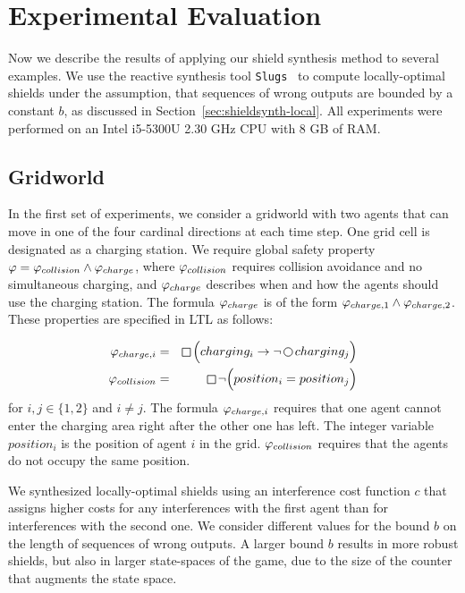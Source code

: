 \section{Experimental Evaluation}
\label{sec_exp}

Now we describe the results of applying our shield synthesis method to several examples. We use the reactive synthesis tool \texttt{Slugs}~\cite{EhlersR16} to compute locally-optimal shields
under the assumption, that sequences of wrong outputs are bounded by a constant $b$, as discussed in Section~\ref{sec:shieldsynth-local}.
All experiments were  performed on an Intel i5-5300U 2.30 GHz CPU with 8 GB of RAM.

\subsection{Gridworld}\label{exp:gridworld}
In the first set of experiments, we consider a gridworld with two agents that can move in one of the four cardinal directions at each time step. One grid cell is designated as a charging station. We require global safety property $\varphi = \varphi_{collision} \wedge \varphi_{charge}$, where $\varphi_{collision}$ requires collision avoidance and no simultaneous charging, and $\varphi_{charge}$ describes when and how the agents should use the charging station.
  The formula $\varphi_{charge}$ is of the form $\varphi_{charge,1} \wedge \varphi_{charge,2}$. These properties are specified in LTL as follows:
  \vspace{-0.3cm}

  \begin{align}\label{eqn:safety2}
  \spec_{charge,i} &= &\LTLglobally\Big(charging_i \rightarrow \lnot \LTLnext charging_j				\Big) \nonumber \\
  \spec_{collision} &=&\LTLglobally \lnot \Big(position_i = position_j				\Big)
  \end{align}
  for $i,j \in \{1,2\}$ and $i \neq j$. The formula $\varphi_{charge,i}$ requires that one agent cannot enter the charging area right  after the other one has left. The integer variable $position_i$ is the position of agent $i$ in the grid. $\varphi_{collision}$ requires that the agents do not occupy the same position.

We synthesized locally-optimal shields using an interference cost function $c$ that assigns higher costs for any interferences with
the first agent than for interferences with the second one. We consider different values for the bound $b$ on the length of sequences of wrong outputs. A larger bound $b$ results in more robust shields, but also in larger state-spaces of the game, due to the size of the counter that augments the state space.

